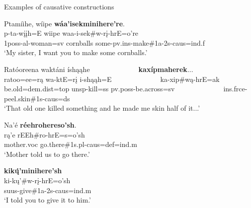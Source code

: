 \begin{exe}
    \item\label{Ch5Causatives} Examples of causative constructions

    \begin{xlist}
        \item\label{Ch5CausativesA} \glll Ptamíihe, wíipe \textbf{wáa'isekminihere're}.\\
        p-ta-wįįh=E wiipe waa-i-sek\#w-rį-hrE=o're\\
        1poss-al-\textnormal{woman}=sv \textnormal{cornballs} \textnormal{some}-pv.ins-\textnormal{make}\#1a-2s-caus=ind.f\\
        \glt `My sister, I want you to make some cornballs.' \citep[299]{hollow1973b}

        \item\label{Ch5CausativesB} \glll Ratóoreena waktáni íshąąhe ~ ~ ~ ~ ~ ~ ~ ~ \textbf{kaxípmaherek}...\\
        ratoo=ee=rą wa-ktE=rį i-shąąh=E ~ ~ ~ ~ ~ ~ ~ ~ ka-xip\#wą-hrE=ak\\
        \textnormal{be.old}=dem.dist=top unsp-\textnormal{kill}=ss pv.poss-\textnormal{be.across}=sv ~ ~ ~ ~ ~ ~ ~ ~ ins.frce-\textnormal{peel.skin}\#1s-caus=ds\\
        \glt `That old one killed something and he made me skin half of it...' \citep[42]{hollow1973a}

        \item\label{Ch5CausativesC} \glll Na'é \textbf{réehrohereso'sh}.\\
        rą'e rEEh\#ro-hrE=s=o'sh\\
        \textnormal{mother}.voc \textnormal{go.there}\#1s.pl-caus=def=ind.m\\
        \glt `Mother told us to go there.' \citep[166]{hollow1973a}

        \item\label{Ch5CausativesD} \glll \textbf{kikų́'minihere'sh}\\
        ki-kų'\#w-rį-hrE=o'sh\\
        suus-\textnormal{give}\#1a-2s-caus=ind.m\\
        \glt `I told you to give it to him.' \citep[59]{hollow1973a}

    \end{xlist}
\end{exe}

